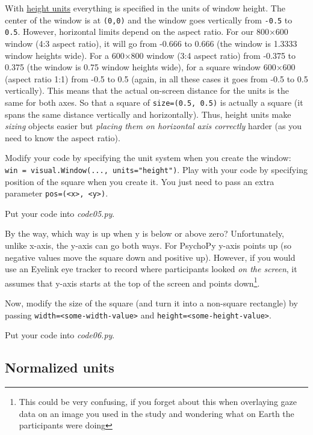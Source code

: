 \documentclass[
]{book}
\begin{document}
With \href{https://psychopy.org/general/units.html\#height-units}{height units} everything is specified in the units of window height. The center of the window is at \texttt{(0,0)} and the window goes vertically from \texttt{-0.5} to \texttt{0.5}. However, horizontal limits depend on the aspect ratio. For our 800×600 window (4:3 aspect ratio), it will go from -0.666 to 0.666 (the window is 1.3333 window heights wide). For a 600×800 window (3:4 aspect ratio) from -0.375 to 0.375 (the window is 0.75 window heights wide), for a square window 600×600 (aspect ratio 1:1) from -0.5 to 0.5 (again, in all these cases it goes from -0.5 to 0.5 vertically). This means that the actual on-screen distance for the units is the same for both axes. So that a square of \texttt{size=(0.5,\ 0.5)} is actually a square (it spans the same distance vertically and horizontally). Thus, height units make \emph{sizing} objects easier but \emph{placing them on horizontal axis correctly} harder (as you need to know the aspect ratio).

Modify your code by specifying the unit system when you create the window: \texttt{win\ =\ visual.Window(...,\ units="height")}. Play with your code by specifying position of the square when you create it. You just need to pass an extra parameter \texttt{pos=(\textless{}x\textgreater{},\ \textless{}y\textgreater{})}.

Put your code into \emph{code05.py}.

By the way, which way is up when y is below or above zero? Unfortunately, unlike x-axis, the y-axis can go both ways. For PsychoPy y-axis points up (so negative values move the square down and positive up). However, if you would use an Eyelink eye tracker to record where participants looked \emph{on the screen}, it assumes that y-axis starts at the top of the screen and points down\footnote{This could be very confusing, if you forget about this when overlaying gaze data on an image you used in the study and wondering what on Earth the participants were doing}.

Now, modify the size of the square (and turn it into a non-square rectangle) by passing \texttt{width=\textless{}some-width-value\textgreater{}} and \texttt{height=\textless{}some-height-value\textgreater{}}.

Put your code into \emph{code06.py}.

\hypertarget{psychopy-units-norm}{%
\subsection{Normalized units}\label{psychopy-units-norm}}
\end{document}
